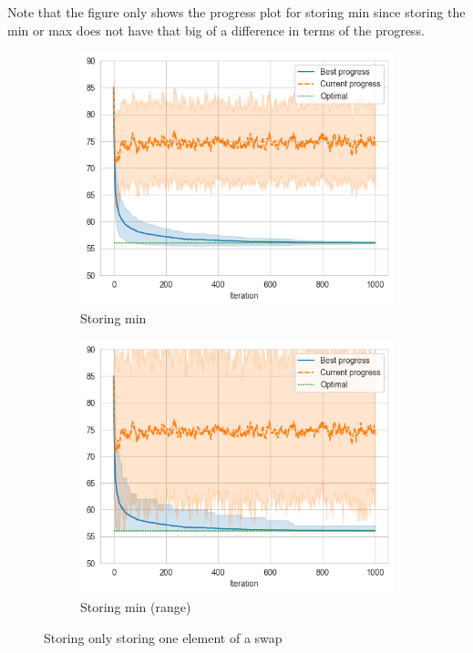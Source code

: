 Note that the figure only shows the progress plot for storing min since storing the min or max does not have that big of a difference in terms of the progress.

\begin{figure}[ht]
    \centering
    \hfill
    \begin{subfigure}{0.48\textwidth}
        \centering
        \includegraphics[width=\textwidth]{../images/p4/store-min.png}
        \caption{Storing min}
    \end{subfigure}
    \hfill
    \begin{subfigure}{0.48\textwidth}
        \centering
        \includegraphics[width=\textwidth]{../images/p4/store-min-pi.png}
        \caption{Storing min (range)}
    \end{subfigure}
    \hfill
    \caption{Storing only storing one element of a swap}
    \label{fig:p4-min}
\end{figure}

